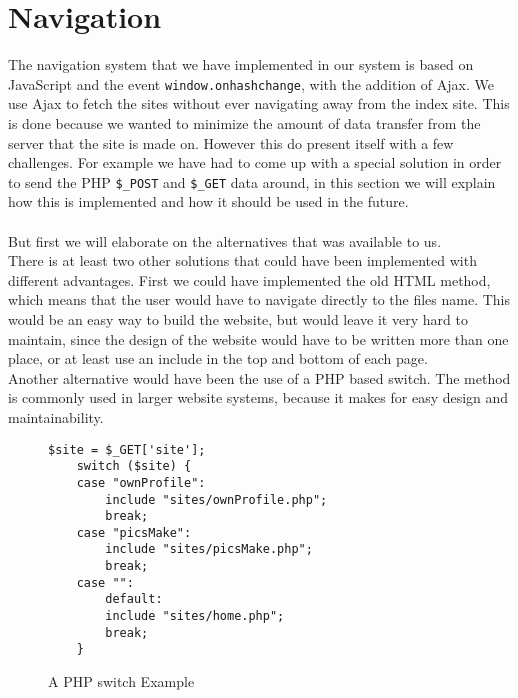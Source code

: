 \section{Navigation}
\label{sec:navigation}
The navigation system that we have implemented in our system is based on JavaScript and the event \texttt{window.onhashchange}, with the addition of Ajax.
We use Ajax to fetch the sites without ever navigating away from the index site. This is done because we wanted to minimize the amount of data transfer from the server that the site is made on. However this do present itself with a few challenges. For example we have had to come up with a special solution in order to send the PHP \texttt{\$\_POST} and \texttt{\$\_GET} data around, in this section we will explain how this is implemented and how it should be used in the future.\\
\\
But first we will elaborate on the alternatives that was available to us.\\
There is at least two other solutions that could have been implemented with different advantages. First we could have implemented the old HTML method, which means that the user would have to navigate directly to the files name. This would be an easy way to build the website, but would leave it very hard to maintain, since the design of the website would have to be written more than one place, or at least use an include in the top and bottom of each page.\\
Another alternative would have been the use of a PHP based switch. The method is commonly used in larger website systems, because it makes for easy design and maintainability.
\lstset{language=PHP}
\begin{figure}[htbp]
\begin{lstlisting}[firstline=1]
	$site = $_GET['site'];
	switch ($site) {
    case "ownProfile":
        include "sites/ownProfile.php";
        break;
    case "picsMake":
        include "sites/picsMake.php";
        break;
    case "":
		default:
        include "sites/home.php";
        break;
	}
\end{lstlisting}
\caption{A PHP switch Example}
\label{lst:phpSwitch}
\end{figure}

